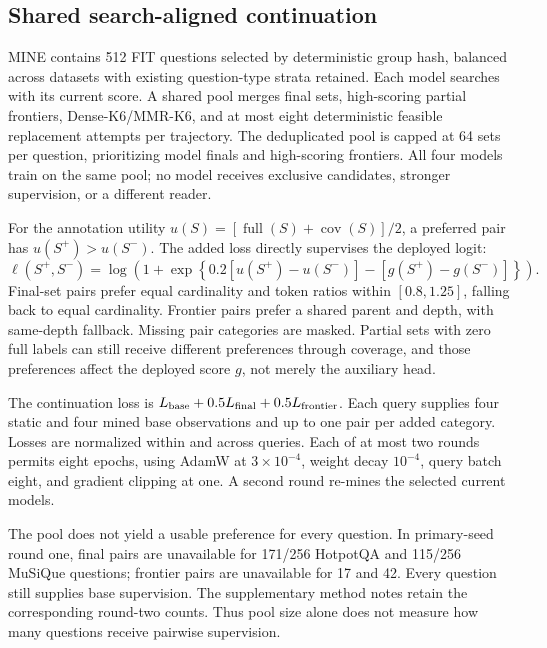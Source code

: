 \documentclass[preprint,12pt]{elsarticle}
\newcommand{\cov}{\operatorname{cov}}
\newcommand{\full}{\operatorname{full}}
\begin{document}
\subsection{Shared search-aligned continuation}
MINE contains 512 FIT questions selected by deterministic group hash, balanced across datasets with existing question-type strata retained. Each model searches with its current score. A shared pool merges final sets, high-scoring partial frontiers, Dense-K6/MMR-K6, and at most eight deterministic feasible replacement attempts per trajectory. The deduplicated pool is capped at 64 sets per question, prioritizing model finals and high-scoring frontiers. All four models train on the same pool; no model receives exclusive candidates, stronger supervision, or a different reader.

For the annotation utility $u(S)=[\full(S)+\cov(S)]/2$, a preferred pair has $u(S^+)>u(S^-)$. The added loss directly supervises the deployed logit:
\begin{equation}\label{eq:pref}
\ell(S^+,S^-)=\log\left(1+\exp\left\{0.2[u(S^+)-u(S^-)]-[g(S^+)-g(S^-)]\right\}\right).
\end{equation}
Final-set pairs prefer equal cardinality and token ratios within $[0.8,1.25]$, falling back to equal cardinality. Frontier pairs prefer a shared parent and depth, with same-depth fallback. Missing pair categories are masked. Partial sets with zero full labels can still receive different preferences through coverage, and those preferences affect the deployed score $g$, not merely the auxiliary head.

The continuation loss is $L_{\rm base}+0.5L_{\rm final}+0.5L_{\rm frontier}$. Each query supplies four static and four mined base observations and up to one pair per added category. Losses are normalized within and across queries. Each of at most two rounds permits eight epochs, using AdamW at $3\times10^{-4}$, weight decay $10^{-4}$, query batch eight, and gradient clipping at one. A second round re-mines the selected current models.

The pool does not yield a usable preference for every question. In primary-seed round one, final pairs are unavailable for 171/256 HotpotQA and 115/256 MuSiQue questions; frontier pairs are unavailable for 17 and 42. Every question still supplies base supervision. The supplementary method notes retain the corresponding round-two counts. Thus pool size alone does not measure how many questions receive pairwise supervision.
\end{document}
